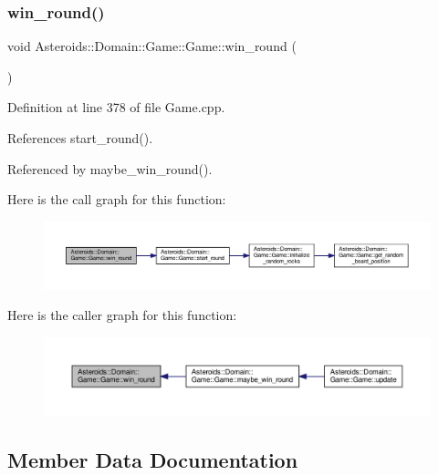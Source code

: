 \subsubsection{\texorpdfstring{win\+\_\+round()}{win\_round()}}
{\footnotesize\ttfamily void Asteroids\+::\+Domain\+::\+Game\+::\+Game\+::win\+\_\+round (\begin{DoxyParamCaption}{ }\end{DoxyParamCaption})\hspace{0.3cm}{\ttfamily [private]}}



Definition at line 378 of file Game.\+cpp.



References start\+\_\+round().



Referenced by maybe\+\_\+win\+\_\+round().

Here is the call graph for this function\+:\nopagebreak
\begin{figure}[H]
\begin{center}
\leavevmode
\includegraphics[width=350pt]{classAsteroids_1_1Domain_1_1Game_1_1Game_ac3e1c5498adb64ea278d1a4b69db412b_cgraph}
\end{center}
\end{figure}
Here is the caller graph for this function\+:\nopagebreak
\begin{figure}[H]
\begin{center}
\leavevmode
\includegraphics[width=350pt]{classAsteroids_1_1Domain_1_1Game_1_1Game_ac3e1c5498adb64ea278d1a4b69db412b_icgraph}
\end{center}
\end{figure}


\subsection{Member Data Documentation}
\mbox{\label{classAsteroids_1_1Domain_1_1Game_1_1Game_a51a65c4fa072bda2baf91d50e9f6195d}} 
